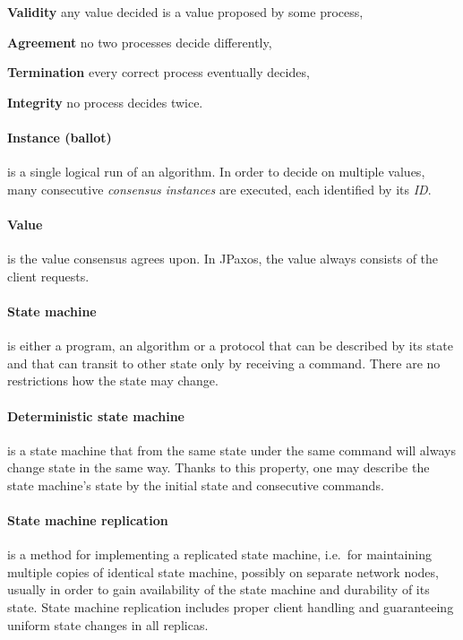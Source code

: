 \begin{tightList}[\setlength{\leftmargin}{2\leftmargin}]
    \item[\textbf{Validity}] any value decided is a value proposed by some process,
    \item[\textbf{Agreement}] no two processes decide differently,
    \item[\textbf{Termination}] every correct process eventually decides,
    \item[\textbf{Integrity}] no process decides twice.
\end{tightList}

\paragraph{Instance (ballot)} is a single logical run of an algorithm. In order to decide on multiple values, many consecutive \textit{consensus instances} are executed, each identified by its \textit{ID}.

\paragraph{Value} is the value consensus agrees upon. In JPaxos, the value always consists of the client requests.

\paragraph{State machine}
is either a program, an algorithm or a protocol that can be described by its state and that can transit to other state only by receiving a command.
There are no restrictions how the state may change.

\paragraph{Deterministic state machine}
is a state machine that from the same state under the same command will always change state in the same way.
Thanks to this property, one may describe the state machine's state by the initial state and consecutive commands. 

\paragraph{State machine replication} is a method for implementing a replicated state machine, i.e.\ for maintaining multiple copies of identical state machine, possibly on separate network nodes, usually in order to gain availability of the state machine and durability of its state. State machine replication includes proper client handling and guaranteeing uniform state changes in all replicas.

